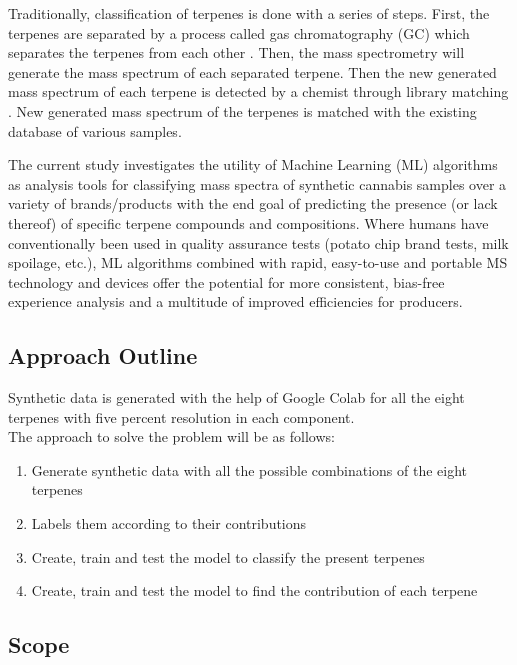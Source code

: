 \documentclass[12pt, a4paper]{article}
\begin{document}
Traditionally, classification of terpenes is done with a series of steps. First, the terpenes are separated by a process called gas chromatography (GC) which separates the terpenes from each other \cite{Jiang2016}. Then, the mass spectrometry will generate the mass spectrum of each separated terpene. Then the new generated mass spectrum of each terpene is detected by a chemist through library matching \cite{Jiang2016}. New generated mass spectrum of the terpenes is matched with the existing database of various samples.

The current study investigates the utility of Machine Learning (ML) algorithms as analysis tools for classifying mass spectra of synthetic cannabis samples over a variety of brands/products with the end goal of predicting the presence (or lack thereof) of specific terpene compounds and compositions. Where humans have conventionally been used in quality assurance tests (potato chip brand tests, milk spoilage, etc.), ML algorithms combined with rapid, easy-to-use and portable MS technology and devices offer the potential for more consistent, bias-free experience analysis and a multitude of improved efficiencies for producers.

\subsection{Approach Outline}
Synthetic data is generated with the help of Google Colab for all the eight terpenes with five percent resolution in each component. \\
The approach to solve the problem will be as follows:
\begin{enumerate}
  \item Generate synthetic data with all the possible combinations of the eight terpenes
  \item Labels them according to their contributions
  \item Create, train and test the model to classify the present terpenes
  \item Create, train and test the model to find the contribution of each terpene
\end{enumerate}

\subsection{Scope}
\end{document}
